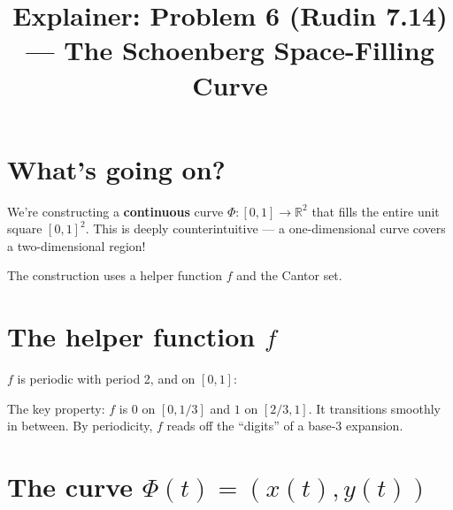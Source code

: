 \documentclass[12pt]{article}
\title{Explainer: Problem 6 (Rudin 7.14) --- The Schoenberg Space-Filling Curve}
\author{}
\date{}
\begin{document}
\maketitle

\section*{What's going on?}
We're constructing a \textbf{continuous} curve $\Phi : [0,1] \to \mathbb{R}^2$ that fills the entire unit square $[0,1]^2$. This is deeply counterintuitive --- a one-dimensional curve covers a two-dimensional region!

The construction uses a helper function $f$ and the Cantor set.

\section*{The helper function $f$}

$f$ is periodic with period 2, and on $[0,1]$:

\begin{center}
\end{center}

The key property: $f$ is $0$ on $[0, 1/3]$ and $1$ on $[2/3, 1]$. It transitions smoothly in between. By periodicity, $f$ reads off the ``digits'' of a base-3 expansion.

\section*{The curve $\Phi(t) = (x(t), y(t))$}
\end{document}
